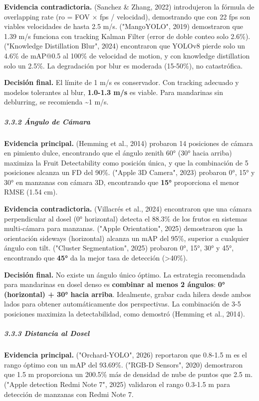 \textbf{Evidencia contradictoria.} (Sanchez \& Zhang, 2022) introdujeron la fórmula de overlapping rate (ro = FOV × fps / velocidad), demostrando que con 22 fps son viables velocidades de hasta 2.5 m/s. ("MangoYOLO", 2019) demostraron que 1.39 m/s funciona con tracking Kalman Filter (error de doble conteo solo 2.6\%). ("Knowledge Distillation Blur", 2024) encontraron que YOLOv8 pierde solo un 4.6\% de mAP@0.5 al 100\% de velocidad de motion, y con knowledge distillation solo un 2.5\%. La degradación por blur es moderada (15-50\%), no catastrófica.


\textbf{Decisión final.} El límite de 1 m/s es conservador. Con tracking adecuado y modelos tolerantes al blur, \textbf{1.0-1.3 m/s} es viable. Para mandarinas sin deblurring, se recomienda \textasciitilde{}1 m/s.


\subparagraph{3.3.2 Ángulo de Cámara}


\textbf{Evidencia principal.} (Hemming et al., 2014) probaron 14 posiciones de cámara en pimiento dulce, encontrando que el ángulo zenith 60° (30° hacia arriba) maximiza la Fruit Detectability como posición única, y que la combinación de 5 posiciones alcanza un FD del 90\%. ("Apple 3D Camera", 2023) probaron 0°, 15° y 30° en manzanas con cámara 3D, encontrando que \textbf{15°} proporciona el menor RMSE (1.54 cm).


\textbf{Evidencia contradictoria.} (Villacrés et al., 2024) encontraron que una cámara perpendicular al dosel (0° horizontal) detecta el 88.3\% de los frutos en sistemas multi-cámara para manzanas. ("Apple Orientation", 2025) demostraron que la orientación sideways (horizontal) alcanza un mAP del 95\%, superior a cualquier ángulo con tilt. ("Cluster Segmentation", 2025) probaron 0°, 15°, 30° y 45°, encontrando que \textbf{45°} da la mejor tasa de detección (>40\%).


\textbf{Decisión final.} No existe un ángulo único óptimo. La estrategia recomendada para mandarinas en dosel denso es \textbf{combinar al menos 2 ángulos}: \textbf{0° (horizontal) + 30° hacia arriba}. Idealmente, grabar cada hilera desde ambos lados para obtener automáticamente dos perspectivas. La combinación de 3-5 posiciones maximiza la detectabilidad, como demostró (Hemming et al., 2014).


\subparagraph{3.3.3 Distancia al Dosel}


\textbf{Evidencia principal.} ("Orchard-YOLO", 2026) reportaron que 0.8-1.5 m es el rango óptimo con un mAP del 93.69\%. ("RGB-D Sensors", 2020) demostraron que 1.5 m proporciona un 200.5\% más de densidad de nube de puntos que 2.5 m. ("Apple detection Redmi Note 7", 2025) validaron el rango 0.3-1.5 m para detección de manzanas con Redmi Note 7.


